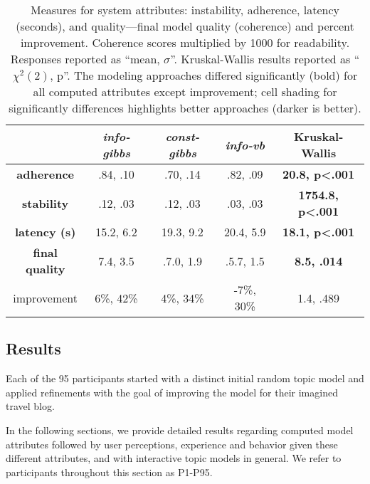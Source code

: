 \begin{table}[t]
  \caption{Measures for system attributes: instability, adherence, latency (seconds), and quality---final model quality (coherence) and percent improvement. Coherence scores multiplied by 1000 for readability. Responses reported as ``mean, $\sigma$''. Kruskal-Wallis
    results reported as
    ``${\chi}^2(2)$, p''.
        The modeling approaches differed significantly (bold) for all computed attributes except improvement; cell shading for significantly differences highlights better approaches (darker is better).}
  \label{tab:attributes}
  \scriptsize
    \begin{center}
    \small
      \begin{tabular}{c c c c c }
        \hline
        & \textit{info-gibbs} & \textit{const-gibbs} & \textit{info-vb} & Kruskal-Wallis \\
        \hline \hline
        \textbf{adherence} &  \cellcolor[gray]{0.7}.84, .10  &  \cellcolor[gray]{0.9}.70, .14 & \cellcolor[gray]{0.7}.82, .09 & \textbf{20.8, p<.001} \\
        \textbf{stability} & \cellcolor[gray]{0.9}.12, .03 & \cellcolor[gray]{0.9}.12, .03 & \cellcolor[gray]{0.7}.03, .03 & \textbf{1754.8, p<.001} \\   
        \textbf{latency (s)} & \cellcolor[gray]{0.7}15.2, 6.2 & \cellcolor[gray]{0.9}19.3, 9.2 & \cellcolor[gray]{0.9}20.4, 5.9 & \textbf{18.1, p<.001} \\ 
        \textbf{final quality}  & \cellcolor[gray]{0.7}7.4, 3.5 & \cellcolor[gray]{0.7}.7.0, 1.9 & \cellcolor[gray]{0.9}.5.7, 1.5 & \textbf{8.5, .014} \\ 
        improvement & 6\%, 42\% & 4\%, 34\% & -7\%, 30\% & 1.4, .489 \\
        \hline
      \end{tabular}
    \end{center}
    \bigskip\centering
\end{table}



\subsection{Results}

Each of the 95 participants started with a distinct initial random topic model
and applied refinements with the
goal of improving the model for their imagined travel blog. 


In the following sections, we provide detailed results regarding computed model attributes followed by user perceptions, experience and behavior given these different attributes, and with interactive topic models in general. We refer to participants throughout this section as P1-P95.

